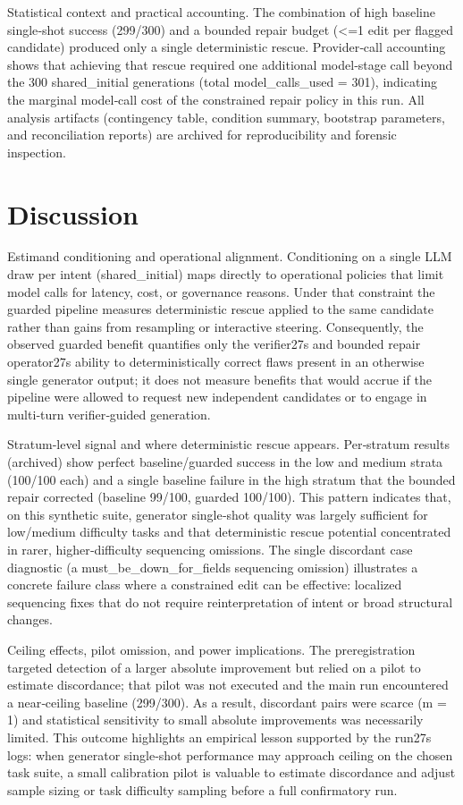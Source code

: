 \documentclass[conference]{IEEEtran}
\begin{document}
Statistical context and practical accounting. The combination of high baseline single‑shot success (299/300) and a bounded repair budget (<=1 edit per flagged candidate) produced only a single deterministic rescue. Provider‑call accounting shows that achieving that rescue required one additional model‑stage call beyond the 300 shared\_initial generations (total model\_calls\_used = 301), indicating the marginal model‑call cost of the constrained repair policy in this run. All analysis artifacts (contingency table, condition summary, bootstrap parameters, and reconciliation reports) are archived for reproducibility and forensic inspection.

\section{Discussion}
Estimand conditioning and operational alignment. Conditioning on a single LLM draw per intent (shared\_initial) maps directly to operational policies that limit model calls for latency, cost, or governance reasons. Under that constraint the guarded pipeline measures deterministic rescue applied to the same candidate rather than gains from resampling or interactive steering. Consequently, the observed guarded benefit quantifies only the verifier 27s and bounded repair operator 27s ability to deterministically correct flaws present in an otherwise single generator output; it does not measure benefits that would accrue if the pipeline were allowed to request new independent candidates or to engage in multi‑turn verifier‑guided generation.

Stratum‑level signal and where deterministic rescue appears. Per‑stratum results (archived) show perfect baseline/guarded success in the low and medium strata (100/100 each) and a single baseline failure in the high stratum that the bounded repair corrected (baseline 99/100, guarded 100/100). This pattern indicates that, on this synthetic suite, generator single‑shot quality was largely sufficient for low/medium difficulty tasks and that deterministic rescue potential concentrated in rarer, higher‑difficulty sequencing omissions. The single discordant case diagnostic (a must\_be\_down\_for\_fields sequencing omission) illustrates a concrete failure class where a constrained edit can be effective: localized sequencing fixes that do not require reinterpretation of intent or broad structural changes.

Ceiling effects, pilot omission, and power implications. The preregistration targeted detection of a larger absolute improvement but relied on a pilot to estimate discordance; that pilot was not executed and the main run encountered a near‑ceiling baseline (299/300). As a result, discordant pairs were scarce (m = 1) and statistical sensitivity to small absolute improvements was necessarily limited. This outcome highlights an empirical lesson supported by the run 27s logs: when generator single‑shot performance may approach ceiling on the chosen task suite, a small calibration pilot is valuable to estimate discordance and adjust sample sizing or task difficulty sampling before a full confirmatory run.
\end{document}
